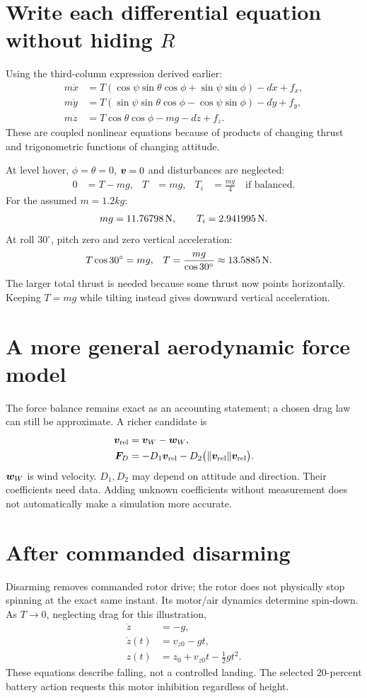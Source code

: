 \section{Write each differential equation without hiding $R$}
Using the third-column expression derived earlier:
\begin{align}
m\ddot x&=T(\cos\psi\sin\theta\cos\phi+\sin\psi\sin\phi)-d\dot x+f_x,\\
m\ddot y&=T(\sin\psi\sin\theta\cos\phi-\cos\psi\sin\phi)-d\dot y+f_y,\\
m\ddot z&=T\cos\theta\cos\phi-mg-d\dot z+f_z.
\end{align}
These are coupled nonlinear equations because of products of changing thrust
and trigonometric functions of changing attitude.

At level hover, $\phi=\theta=0$, $\bm{v}=0$ and disturbances are neglected:
\begin{align}
0&=T-mg,&T&=mg,&T_i&=\frac{mg}{4}\quad\text{if balanced}.
\end{align}
For the assumed $m=1.2\unit{kg}$:
\begin{equation}
mg=11.76798\,\mathrm{N},\qquad T_i=2.941995\,\mathrm{N}.
\end{equation}
At roll $30^\circ$, pitch zero and zero vertical acceleration:
\begin{align}
T\cos30^\circ&=mg,&
T&=\frac{mg}{\cos30^\circ}\approx13.5885\,\mathrm{N}.
\end{align}
The larger total thrust is needed because some thrust now points horizontally.
Keeping $T=mg$ while tilting instead gives downward vertical acceleration.

\section{A more general aerodynamic force model}
The force balance remains exact as an accounting statement; a chosen drag law
can still be approximate. A richer candidate is
\begin{align}
\bm{v}_{\rm rel}&=\bm{v}_W-\bm{w}_W,\\
\bm{F}_D&=-D_1\bm{v}_{\rm rel}
-D_2\bigl(\|\bm{v}_{\rm rel}\|\bm{v}_{\rm rel}\bigr).
\end{align}
$\bm{w}_W$ is wind velocity. $D_1,D_2$ may depend on attitude and direction.
Their coefficients need data. Adding unknown coefficients without measurement
does not automatically make a simulation more accurate.

\section{After commanded disarming}
Disarming removes commanded rotor drive; the rotor does not physically stop
spinning at the exact same instant. Its motor/air dynamics determine spin-down.
As $T\to0$, neglecting drag for this illustration,
\begin{align}
\ddot z&=-g,\\
\dot z(t)&=v_{z0}-gt,\\
z(t)&=z_0+v_{z0}t-\tfrac12gt^2.
\end{align}
These equations describe falling, not a controlled landing. The selected
20-percent battery action requests this motor inhibition regardless of height.

